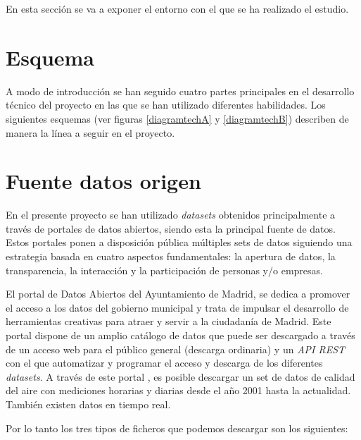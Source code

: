 
En esta sección se va a exponer el entorno con el que se ha realizado el estudio. 


\section{Esquema}

A modo de introducción se han seguido cuatro partes principales en el desarrollo técnico del proyecto en las que se han utilizado diferentes habilidades. Los siguientes esquemas (ver figuras \ref{diagramtechA} y \ref{diagramtechB}) describen de manera la línea a seguir en el proyecto.


\section{Fuente datos origen}

En el presente proyecto se han utilizado \textit{datasets} obtenidos principalmente a través de portales de datos abiertos, siendo esta la principal fuente de datos. Estos portales ponen a disposición pública múltiples sets de datos siguiendo una estrategia basada en cuatro aspectos fundamentales: la apertura de datos, la transparencia, la interacción y la participación de personas y/o empresas. 

El portal de Datos Abiertos del Ayuntamiento de Madrid, se dedica a promover el acceso a los datos del gobierno municipal y trata de impulsar el desarrollo de herramientas creativas para atraer y servir a la ciudadanía de Madrid. 
Este portal dispone de un amplio catálogo de datos que puede ser descargado a través de un acceso web para el público general (descarga ordinaria) y un \textit{API REST} con el que automatizar y programar el acceso y descarga de los diferentes \textit{datasets}. A través de este portal \cite{portal_datosabiertos_madrid}, es posible descargar un set de datos de calidad del aire con mediciones horarias y diarias desde el año 2001 hasta la actualidad. También existen datos en tiempo real.

Por lo tanto los tres tipos de ficheros que podemos descargar son los siguientes:

